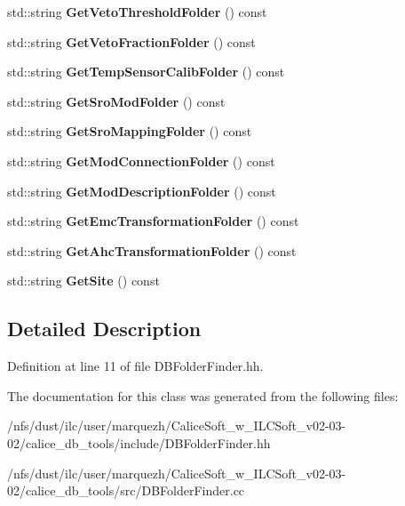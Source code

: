 \begin{DoxyCompactItemize}
\item 
std\-::string {\bfseries Get\-Veto\-Threshold\-Folder} () const \label{classDBFolderFinder_a02b8210d29dcafbe27c3890781b76d06}

\item 
std\-::string {\bfseries Get\-Veto\-Fraction\-Folder} () const \label{classDBFolderFinder_a1d664f89b6afde8d726cd9f9bb707429}

\item 
std\-::string {\bfseries Get\-Temp\-Sensor\-Calib\-Folder} () const \label{classDBFolderFinder_a4d1cb869842f398416f9984b524f513a}

\item 
std\-::string {\bfseries Get\-Sro\-Mod\-Folder} () const \label{classDBFolderFinder_a5b3261aa1720470c26ea054f1ddb55d1}

\item 
std\-::string {\bfseries Get\-Sro\-Mapping\-Folder} () const \label{classDBFolderFinder_a8018b180b74c13339d32a65bd0035161}

\item 
std\-::string {\bfseries Get\-Mod\-Connection\-Folder} () const \label{classDBFolderFinder_a82935227a4d2a6881030710f6aad218e}

\item 
std\-::string {\bfseries Get\-Mod\-Description\-Folder} () const \label{classDBFolderFinder_a9992294018ae366836e917f82c161f41}

\item 
std\-::string {\bfseries Get\-Emc\-Transformation\-Folder} () const \label{classDBFolderFinder_a9078a0d7aed28a88db1a43690a1a7fbc}

\item 
std\-::string {\bfseries Get\-Ahc\-Transformation\-Folder} () const \label{classDBFolderFinder_af7c8ce112c67bc6d169aa742c1b94942}

\item 
std\-::string {\bfseries Get\-Site} () const \label{classDBFolderFinder_ae8ed08254ec1a4aa213f5c354724ed25}

\end{DoxyCompactItemize}


\subsection{Detailed Description}


Definition at line 11 of file D\-B\-Folder\-Finder.\-hh.



The documentation for this class was generated from the following files\-:\begin{DoxyCompactItemize}
\item 
/nfs/dust/ilc/user/marquezh/\-Calice\-Soft\-\_\-w\-\_\-\-I\-L\-C\-Soft\-\_\-v02-\/03-\/02/calice\-\_\-db\-\_\-tools/include/D\-B\-Folder\-Finder.\-hh\item 
/nfs/dust/ilc/user/marquezh/\-Calice\-Soft\-\_\-w\-\_\-\-I\-L\-C\-Soft\-\_\-v02-\/03-\/02/calice\-\_\-db\-\_\-tools/src/D\-B\-Folder\-Finder.\-cc\end{DoxyCompactItemize}
